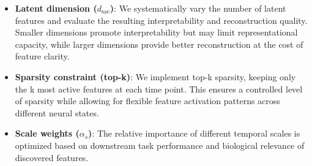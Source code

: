 \begin{itemize}
\item \textbf{Latent dimension ($d_{\text{sae}}$)}: We systematically vary the number of latent features and evaluate the resulting interpretability and reconstruction quality. Smaller dimensions promote interpretability but may limit representational capacity, while larger dimensions provide better reconstruction at the cost of feature clarity.

\item \textbf{Sparsity constraint (top-k)}: We implement top-k sparsity, keeping only the k most active features at each time point. This ensures a controlled level of sparsity while allowing for flexible feature activation patterns across different neural states.

\item \textbf{Scale weights ($\alpha_s$)}: The relative importance of different temporal scales is optimized based on downstream task performance and biological relevance of discovered features.
\end{itemize}
